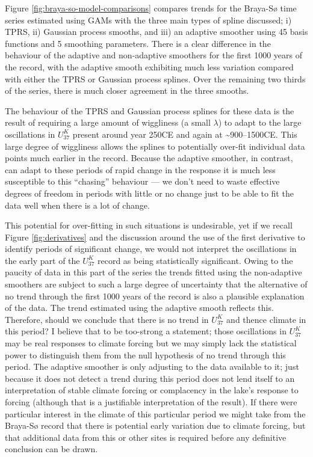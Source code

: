 \documentclass[12pt,]{article}
\newcommand{\uk}{\ensuremath{\mathit{U}^{\mathit{K}}_{\mathup{37}}}}
\begin{document}
Figure \ref{fig:braya-so-model-comparisons} compares trends for the
Braya-Sø time series estimated using GAMs with the three main types of
spline discussed; i) TPRS, ii) Gaussian process smooths, and iii) an
adaptive smoother using 45 basis functions and 5 smoothing parameters.
There is a clear difference in the behaviour of the adaptive and
non-adaptive smoothers for the first 1000 years of the record, with the
adaptive smooth exhibiting much less variation compared with either the
TPRS or Gaussian process splines. Over the remaining two thirds of the
series, there is much closer agreement in the three smooths.

The behaviour of the TPRS and Gaussian process splines for these data is
the result of requiring a large amount of wiggliness (a small
\(\lambda\)) to adapt to the large oscillations in \uk{} present around
year 250CE and again at \textasciitilde{}900--1500CE. This large degree
of wiggliness allows the splines to potentially over-fit individual data
points much earlier in the record. Because the adaptive smoother, in
contrast, can adapt to these periods of rapid change in the response it
is much less susceptible to this ``chasing'' behaviour --- we don't need
to waste effective degrees of freedom in periods with little or no
change just to be able to fit the data well when there is a lot of
change.

This potential for over-fitting in such situations is undesirable, yet
if we recall Figure \ref{fig:derivatives} and the discussion around the
use of the first derivative to identify periods of significant change,
we would not interpret the oscillations in the early part of the \uk{}
record as being statistically significant. Owing to the paucity of data
in this part of the series the trends fitted using the non-adaptive
smoothers are subject to such a large degree of uncertainty that the
alternative of no trend through the first 1000 years of the record is
also a plausible explanation of the data. The trend estimated using the
adaptive smooth reflects this. Therefore, should we conclude that there
is no trend in \uk{} and thence climate in this period? I believe that
to be too-strong a statement; those oscillations in \uk{} may be real
responses to climate forcing but we may simply lack the statistical
power to distinguish them from the null hypothesis of no trend through
this period. The adaptive smoother is only adjusting to the data
available to it; just because it does not detect a trend during this
period does not lend itself to an interpretation of stable climate
forcing or complacency in the lake's response to forcing (although that
is a justifiable interpretation of the result). If there were particular
interest in the climate of this particular period we might take from the
Braya-Sø record that there is potential early variation due to climate
forcing, but that additional data from this or other sites is required
before any definitive conclusion can be drawn.
\end{document}
